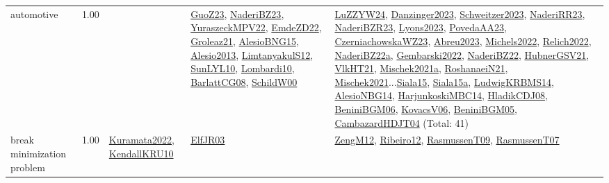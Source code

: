{\begin{longtable}{p{3cm}r>{\raggedright\arraybackslash}p{6cm}>{\raggedright\arraybackslash}p{6cm}>{\raggedright\arraybackslash}p{8cm}}
\index{automotive}\index{ApplicationAreas!automotive}automotive &  1.00 &  & \hyperref[detail:GuoZ23]{GuoZ23}, \hyperref[detail:NaderiBZ23]{NaderiBZ23}, \hyperref[detail:YuraszeckMPV22]{YuraszeckMPV22}, \hyperref[detail:EmdeZD22]{EmdeZD22}, \hyperref[detail:Groleaz21]{Groleaz21}, \hyperref[detail:AlesioBNG15]{AlesioBNG15}, \hyperref[detail:Alesio2013]{Alesio2013}, \hyperref[detail:LimtanyakulS12]{LimtanyakulS12}, \hyperref[detail:SunLYL10]{SunLYL10}, \hyperref[detail:Lombardi10]{Lombardi10}, \hyperref[detail:BarlattCG08]{BarlattCG08}, \hyperref[detail:SchildW00]{SchildW00} & \hyperref[detail:LuZZYW24]{LuZZYW24}, \hyperref[detail:Danzinger2023]{Danzinger2023}, \hyperref[detail:Schweitzer2023]{Schweitzer2023}, \hyperref[detail:NaderiRR23]{NaderiRR23}, \hyperref[detail:NaderiBZR23]{NaderiBZR23}, \hyperref[detail:Lyons2023]{Lyons2023}, \hyperref[detail:PovedaAA23]{PovedaAA23}, \hyperref[detail:CzerniachowskaWZ23]{CzerniachowskaWZ23}, \hyperref[detail:Abreu2023]{Abreu2023}, \hyperref[detail:Michels2022]{Michels2022}, \hyperref[detail:Relich2022]{Relich2022}, \hyperref[detail:NaderiBZ22a]{NaderiBZ22a}, \hyperref[detail:Gembarski2022]{Gembarski2022}, \hyperref[detail:NaderiBZ22]{NaderiBZ22}, \hyperref[detail:HubnerGSV21]{HubnerGSV21}, \hyperref[detail:VlkHT21]{VlkHT21}, \hyperref[detail:Mischek2021a]{Mischek2021a}, \hyperref[detail:RoshanaeiN21]{RoshanaeiN21}, \hyperref[detail:Mischek2021]{Mischek2021}...\hyperref[detail:Siala15]{Siala15}, \hyperref[detail:Siala15a]{Siala15a}, \hyperref[detail:LudwigKRBMS14]{LudwigKRBMS14}, \hyperref[detail:AlesioNBG14]{AlesioNBG14}, \hyperref[detail:HarjunkoskiMBC14]{HarjunkoskiMBC14}, \hyperref[detail:HladikCDJ08]{HladikCDJ08}, \hyperref[detail:BeniniBGM06]{BeniniBGM06}, \hyperref[detail:KovacsV06]{KovacsV06}, \hyperref[detail:BeniniBGM05]{BeniniBGM05}, \hyperref[detail:CambazardHDJT04]{CambazardHDJT04} (Total: 41)\\
\index{break minimization problem}\index{ApplicationAreas!break minimization problem}break minimization problem &  1.00 & \hyperref[detail:Kuramata2022]{Kuramata2022}, \hyperref[detail:KendallKRU10]{KendallKRU10} & \hyperref[detail:ElfJR03]{ElfJR03} & \hyperref[detail:ZengM12]{ZengM12}, \hyperref[detail:Ribeiro12]{Ribeiro12}, \hyperref[detail:RasmussenT09]{RasmussenT09}, \hyperref[detail:RasmussenT07]{RasmussenT07}\\

\end{longtable}}
